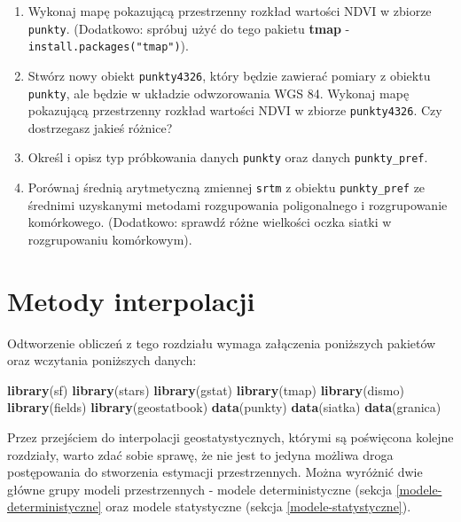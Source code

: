 \documentclass[
  paper=6in:9in,pagesize=pdftex,headinclude=on,footinclude=on,10pt]{scrbook}
\newenvironment{Shaded}{\begin{snugshade}}{\end{snugshade}}
\newcommand{\FunctionTok}[1]{\textcolor[rgb]{0.13,0.29,0.53}{\textbf{#1}}}
\newcommand{\NormalTok}[1]{#1}
\providecommand{\tightlist}{%
  \setlength{\itemsep}{0pt}\setlength{\parskip}{0pt}}
\begin{document}
\begin{enumerate}
\def\labelenumi{\arabic{enumi}.}
\tightlist
\item
  Wykonaj mapę pokazującą przestrzenny rozkład wartości NDVI w zbiorze \texttt{punkty}.
  (Dodatkowo: spróbuj użyć do tego pakietu \textbf{tmap} - \texttt{install.packages("tmap")}).
\item
  Stwórz nowy obiekt \texttt{punkty4326}, który będzie zawierać pomiary z obiektu \texttt{punkty}, ale będzie w układzie odwzorowania WGS 84.
  Wykonaj mapę pokazującą przestrzenny rozkład wartości NDVI w zbiorze \texttt{punkty4326}.
  Czy dostrzegasz jakieś różnice?
\item
  Określ i opisz typ próbkowania danych \texttt{punkty} oraz danych \texttt{punkty\_pref}.
\item
  Porównaj średnią arytmetyczną zmiennej \texttt{srtm} z obiektu \texttt{punkty\_pref} ze średnimi uzyskanymi metodami rozgupowania poligonalnego i rozgrupowanie komórkowego.
  (Dodatkowo: sprawdź różne wielkości oczka siatki w rozgrupowaniu komórkowym).
\end{enumerate}

\chapter{Metody interpolacji}\label{metody-interpolacji}

Odtworzenie obliczeń z tego rozdziału wymaga załączenia poniższych pakietów oraz wczytania poniższych danych:

\begin{Shaded}
\begin{Highlighting}[]
\FunctionTok{library}\NormalTok{(sf)}
\FunctionTok{library}\NormalTok{(stars)}
\FunctionTok{library}\NormalTok{(gstat)}
\FunctionTok{library}\NormalTok{(tmap)}
\FunctionTok{library}\NormalTok{(dismo)}
\FunctionTok{library}\NormalTok{(fields)}
\FunctionTok{library}\NormalTok{(geostatbook)}
\FunctionTok{data}\NormalTok{(punkty)}
\FunctionTok{data}\NormalTok{(siatka)}
\FunctionTok{data}\NormalTok{(granica)}
\end{Highlighting}
\end{Shaded}

Przez przejściem do interpolacji geostatystycznych, którymi są poświęcona kolejne rozdziały, warto zdać sobie sprawę, że nie jest to jedyna możliwa droga postępowania do stworzenia estymacji przestrzennych.
Można wyróżnić dwie główne grupy modeli przestrzennych - modele deterministyczne (sekcja \ref{modele-deterministyczne} oraz modele statystyczne (sekcja \ref{modele-statystyczne}).
\end{document}
